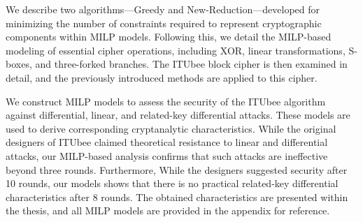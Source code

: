 We describe two algorithms—Greedy and New-Reduction—developed for minimizing the number of constraints required to represent cryptographic components within MILP models. Following this, we detail the MILP-based modeling of essential cipher operations, including XOR, linear transformations, S-boxes, and three-forked branches. The ITUbee block cipher is then examined in detail, and the previously introduced methods are applied to this cipher.

We construct MILP models to assess the security of the ITUbee algorithm against differential, linear, and related-key differential attacks. These models are used to derive corresponding cryptanalytic characteristics. While the original designers of ITUbee claimed theoretical resistance to linear and differential attacks, our MILP-based analysis confirms that such attacks are ineffective beyond three rounds. Furthermore, While the designers suggested security after 10 rounds, our models shows that there is no practical related-key differential characteristics after 8 rounds. The obtained characteristics are presented within the thesis, and all MILP models are provided in the appendix for reference.



